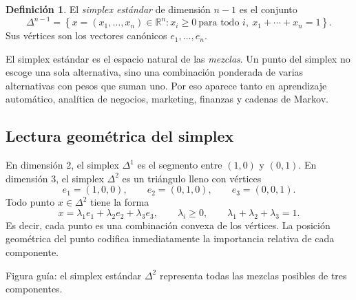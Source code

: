 \documentclass[10pt,a4paper,oneside]{article}
\theoremstyle{plain}
\theoremstyle{definition}
\newtheorem{definition}[theorem]{Definición}
\theoremstyle{remark}
\newcommand{\R}{\mathbb{R}}
\newcommand{\set}[1]{\left\{ #1 \right\}}
\begin{document}
\begin{definition}
El \emph{simplex estándar} de dimensión $n-1$ es el conjunto
\[
\Delta^{n-1}=\set{x=(x_1,\dots,x_n)\in\R^n: x_i\ge 0\ \text{para todo }i,\ x_1+\cdots+x_n=1}.
\]
Sus vértices son los vectores canónicos $e_1,\dots,e_n$.
\end{definition}

\begin{intuitionBox}
El simplex estándar es el espacio natural de las \emph{mezclas}. Un punto del simplex no escoge una sola alternativa, sino una combinación ponderada de varias alternativas con pesos que suman uno. Por eso aparece tanto en aprendizaje automático, analítica de negocios, marketing, finanzas y cadenas de Markov.
\end{intuitionBox}

\subsection{Lectura geométrica del simplex}

En dimensión $2$, el simplex $\Delta^1$ es el segmento entre $(1,0)$ y $(0,1)$. En dimensión $3$, el simplex $\Delta^2$ es un triángulo lleno con vértices
\[
e_1=(1,0,0),\qquad e_2=(0,1,0),\qquad e_3=(0,0,1).
\]
Todo punto $x\in\Delta^2$ tiene la forma
\[
x=\lambda_1 e_1+\lambda_2 e_2+\lambda_3 e_3,
\qquad
\lambda_i\ge 0,
\qquad
\lambda_1+\lambda_2+\lambda_3=1.
\]
Es decir, cada punto es una combinación convexa de los vértices. La posición geométrica del punto codifica inmediatamente la importancia relativa de cada componente.

\begin{center}

{\small Figura guía: el simplex estándar $\Delta^2$ representa todas las mezclas posibles de tres componentes.}
\end{center}
\end{document}
